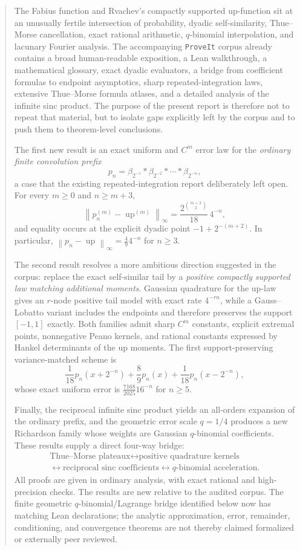 \documentclass[11pt]{article}
\numberwithin{equation}{section}
\theoremstyle{definition}
\theoremstyle{remark}
\newcommand{\Up}{\operatorname{up}}
\newcommand{\norm}[1]{\left\lVert#1\right\rVert}
\begin{document}
\begin{abstract}
The Fabius function and Rvachev's compactly supported up-function sit at an unusually fertile intersection of probability, dyadic self-similarity, Thue--Morse cancellation, exact rational arithmetic, $q$-binomial interpolation, and lacunary Fourier analysis.  The accompanying \texttt{ProveIt} corpus already contains a broad human-readable exposition, a Lean walkthrough, a mathematical glossary, exact dyadic evaluators, a bridge from coefficient formulas to endpoint asymptotics, sharp repeated-integration laws, extensive Thue--Morse formula atlases, and a detailed analysis of the infinite sinc product.  The purpose of the present report is therefore not to repeat that material, but to isolate gaps explicitly left by the corpus and to push them to theorem-level conclusions.

The first new result is an exact uniform and $C^m$ error law for the \emph{ordinary finite convolution prefix}
\[
 p_n=\beta_{2^{-1}}*\beta_{2^{-2}}*\cdots*\beta_{2^{-n}},
\]
a case that the existing repeated-integration report deliberately left open.  For every $m\ge0$ and $n\ge m+3$,
\[
 \norm{p_n^{(m)}-\Up^{(m)}}_\infty
 =\frac{2^{\binom{m+3}{2}}}{18}\,4^{-n},
\]
and equality occurs at the explicit dyadic point $-1+2^{-(m+2)}$.  In particular,
\(\norm{p_n-\Up}_\infty=\frac49 4^{-n}\) for $n\ge3$.

The second result resolves a more ambitious direction suggested in the corpus: replace the exact self-similar tail by a \emph{positive compactly supported law matching additional moments}.  Gaussian quadrature for the up-law gives an $r$-node positive tail model with exact rate $4^{-rn}$, while a Gauss--Lobatto variant includes the endpoints and therefore preserves the support $[-1,1]$ exactly.  Both families admit sharp $C^m$ constants, explicit extremal points, nonnegative Peano kernels, and rational constants expressed by Hankel determinants of the up moments.  The first support-preserving variance-matched scheme is
\[
 \frac1{18}p_n(x+2^{-n})+\frac89p_n(x)+\frac1{18}p_n(x-2^{-n}),
\]
whose exact uniform error is \(\frac{7168}{2025}16^{-n}\) for $n\ge5$.

Finally, the reciprocal infinite sinc product yields an all-orders expansion of the ordinary prefix, and the geometric error scale $q=1/4$ produces a new Richardson family whose weights are Gaussian $q$-binomial coefficients.  These results supply a direct four-way bridge:
\[
\begin{gathered}
\text{Thue--Morse plateaux}
\longleftrightarrow
\text{positive quadrature kernels}\\
\longleftrightarrow
\text{reciprocal sinc coefficients}
\longleftrightarrow
q\text{-binomial acceleration}.
\end{gathered}
\]
All proofs are given in ordinary analysis, with exact rational and high-precision checks.  The results are new relative to the audited corpus.  The finite geometric \(q\)-binomial/Lagrange bridge identified below now has matching Lean declarations; the analytic approximation, error, remainder, conditioning, and convergence theorems are not thereby claimed formalized or externally peer reviewed.
\end{abstract}
\end{document}
